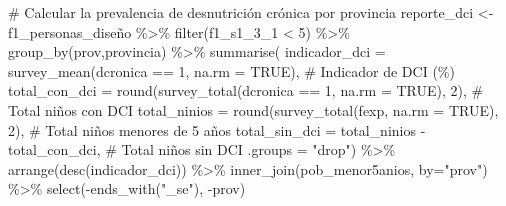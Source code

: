 \documentclass[
  letterpaper,
  DIV=11,
  numbers=noendperiod]{scrreprt}
\newenvironment{Shaded}{\begin{snugshade}}{\end{snugshade}}
\newcommand{\AttributeTok}[1]{\textcolor[rgb]{0.40,0.45,0.13}{#1}}
\newcommand{\CommentTok}[1]{\textcolor[rgb]{0.37,0.37,0.37}{#1}}
\newcommand{\ConstantTok}[1]{\textcolor[rgb]{0.56,0.35,0.01}{#1}}
\newcommand{\DecValTok}[1]{\textcolor[rgb]{0.68,0.00,0.00}{#1}}
\newcommand{\FunctionTok}[1]{\textcolor[rgb]{0.28,0.35,0.67}{#1}}
\newcommand{\NormalTok}[1]{\textcolor[rgb]{0.00,0.23,0.31}{#1}}
\newcommand{\OtherTok}[1]{\textcolor[rgb]{0.00,0.23,0.31}{#1}}
\newcommand{\SpecialCharTok}[1]{\textcolor[rgb]{0.37,0.37,0.37}{#1}}
\newcommand{\StringTok}[1]{\textcolor[rgb]{0.13,0.47,0.30}{#1}}
\begin{document}
\begin{Shaded}
\begin{Highlighting}[]
\CommentTok{\# Calcular la prevalencia de desnutrición crónica por provincia}
\NormalTok{reporte\_dci }\OtherTok{\textless{}{-}}\NormalTok{ f1\_personas\_diseño }\SpecialCharTok{\%\textgreater{}\%}
    \FunctionTok{filter}\NormalTok{(f1\_s1\_3\_1 }\SpecialCharTok{\textless{}} \DecValTok{5}\NormalTok{) }\SpecialCharTok{\%\textgreater{}\%}
    \FunctionTok{group\_by}\NormalTok{(prov,provincia) }\SpecialCharTok{\%\textgreater{}\%}
    \FunctionTok{summarise}\NormalTok{(}
        \AttributeTok{indicador\_dci =} \FunctionTok{survey\_mean}\NormalTok{(dcronica }\SpecialCharTok{==} \DecValTok{1}\NormalTok{, }\AttributeTok{na.rm =} \ConstantTok{TRUE}\NormalTok{),  }\CommentTok{\# Indicador de DCI (\%)}
        \AttributeTok{total\_con\_dci =} \FunctionTok{round}\NormalTok{(}\FunctionTok{survey\_total}\NormalTok{(dcronica }\SpecialCharTok{==} \DecValTok{1}\NormalTok{, }\AttributeTok{na.rm =} \ConstantTok{TRUE}\NormalTok{), }\DecValTok{2}\NormalTok{),  }\CommentTok{\# Total niños con DCI}
        \AttributeTok{total\_ninios =} \FunctionTok{round}\NormalTok{(}\FunctionTok{survey\_total}\NormalTok{(fexp, }\AttributeTok{na.rm =} \ConstantTok{TRUE}\NormalTok{), }\DecValTok{2}\NormalTok{),  }\CommentTok{\# Total niños menores de 5 años}
        \AttributeTok{total\_sin\_dci =}\NormalTok{ total\_ninios }\SpecialCharTok{{-}}\NormalTok{ total\_con\_dci,  }\CommentTok{\# Total niños sin DCI}
        \AttributeTok{.groups =} \StringTok{"drop"}\NormalTok{) }\SpecialCharTok{\%\textgreater{}\%} 
    \FunctionTok{arrange}\NormalTok{(}\FunctionTok{desc}\NormalTok{(indicador\_dci)) }\SpecialCharTok{\%\textgreater{}\%} 
    \FunctionTok{inner\_join}\NormalTok{(pob\_menor5anios, }\AttributeTok{by=}\StringTok{"prov"}\NormalTok{) }\SpecialCharTok{\%\textgreater{}\%} 
    \FunctionTok{select}\NormalTok{(}\SpecialCharTok{{-}}\FunctionTok{ends\_with}\NormalTok{(}\StringTok{"\_se"}\NormalTok{), }\SpecialCharTok{{-}}\NormalTok{prov)}


\end{Highlighting}
\end{Shaded}
\end{document}
